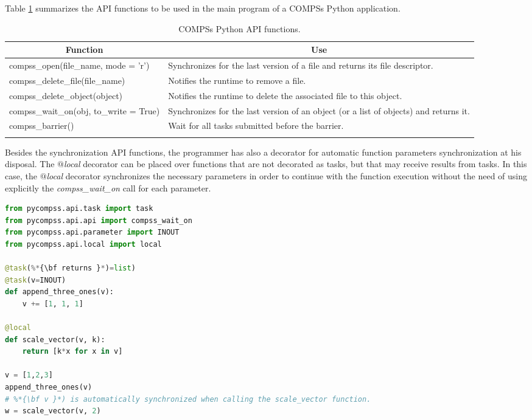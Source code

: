 Table \ref{tab:python_api_functions} summarizes the API functions to be used in the main program of a COMPSs Python application.
\bgroup
  \def\arraystretch{1.5}%
  \begin{longtable}{| p{} | p{} |}
    \hline
    \multicolumn{1}{|c|}{{\bf Function }}    &  \multicolumn{1}{c|}{{\bf Use }}\\
    \hline
    compss\_open(file\_name, mode = 'r') & Synchronizes for the last version of a file and returns its file descriptor. \\
    \hline
    compss\_delete\_file(file\_name) & Notifies the runtime to remove a file. \\
    \hline
    compss\_delete\_object(object) & Notifies the runtime to delete the associated file to this object. \\
    \hline
    compss\_wait\_on(obj, to\_write = True) & Synchronizes for the last version of an object (or a list of objects) and returns it. \\
    \hline
    compss\_barrier() & Wait for all tasks submitted before the barrier. \\
    \hline
    \caption{COMPSs Python API functions.}
    \label{tab:python_api_functions}
  \end{longtable}
\egroup

Besides the synchronization API functions, the programmer has also a decorator for automatic function parameters synchronization 
at his disposal. The {\it $@$local} decorator can be placed over functions that are not decorated as tasks, but that may receive 
results from tasks. In this case, the {\it $@$local} decorator synchronizes the necessary parameters in order to continue with 
the function execution without the need of using explicitly the {\it compss\_wait\_on} call for each parameter.

\begin{lstlisting}[language=python]
from pycompss.api.task import task
from pycompss.api.api import compss_wait_on
from pycompss.api.parameter import INOUT
from pycompss.api.local import local

@task(%*{\bf returns }*)=list)
@task(v=INOUT)
def append_three_ones(v):
    v += [1, 1, 1]

@local
def scale_vector(v, k):
    return [k*x for x in v]

v = [1,2,3]
append_three_ones(v)
# %*{\bf v }*) is automatically synchronized when calling the scale_vector function.
w = scale_vector(v, 2)

\end{lstlisting}


